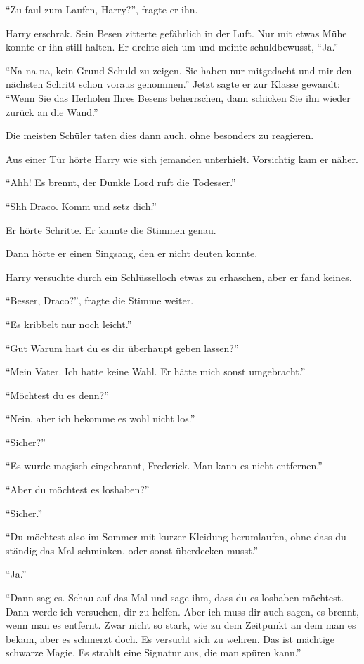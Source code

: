 \enquote{Zu faul zum Laufen, Harry?}, fragte er ihn.

Harry erschrak. Sein Besen zitterte gefährlich in der Luft. Nur mit etwas Mühe konnte er ihn still halten. Er drehte sich um und meinte schuldbewusst, \enquote{Ja.}

\enquote{Na na na, kein Grund Schuld zu zeigen. Sie haben nur mitgedacht und mir den nächsten Schritt schon voraus genommen.} Jetzt sagte er zur Klasse gewandt: \enquote{Wenn Sie das Herholen Ihres Besens beherrschen, dann schicken Sie ihn wieder zurück an die Wand.}

Die meisten Schüler taten dies dann auch, ohne besonders zu reagieren.

\trenn

Aus einer Tür hörte Harry wie sich jemanden unterhielt. Vorsichtig kam er näher.

\enquote{Ahh! Es brennt, der Dunkle Lord ruft die Todesser.}

\enquote{Shh Draco. Komm und setz dich.}

Er hörte Schritte. Er kannte die Stimmen genau.

Dann hörte er einen Singsang, den er nicht deuten konnte. 

Harry versuchte durch ein Schlüsselloch etwas zu erhaschen, aber er fand keines.

\enquote{Besser, Draco?}, fragte die Stimme weiter.

\enquote{Es kribbelt nur noch leicht.}

\enquote{Gut \gst Warum hast du es dir überhaupt geben lassen?}

\enquote{Mein Vater. Ich hatte keine Wahl. Er hätte mich sonst umgebracht.}

\enquote{Möchtest du es denn?}

\enquote{Nein, aber ich bekomme es wohl nicht los.}

\enquote{Sicher?}

\enquote{Es wurde magisch eingebrannt, Frederick. Man kann es nicht entfernen.}

\enquote{Aber du möchtest es loshaben?}

\enquote{Sicher.}

\enquote{Du möchtest also im Sommer mit kurzer Kleidung herumlaufen, ohne dass du ständig das Mal schminken, oder sonst überdecken musst.}

\enquote{Ja.}

\enquote{Dann sag es. Schau auf das Mal und sage ihm, dass du es loshaben möchtest. \gst Dann werde ich versuchen, dir zu helfen. \gst Aber ich muss dir auch sagen, es brennt, wenn man es entfernt. Zwar nicht so stark, wie zu dem Zeitpunkt an dem man es bekam, aber es schmerzt doch. Es versucht sich zu wehren. Das ist mächtige schwarze Magie. Es strahlt eine Signatur aus, die man spüren kann.}

